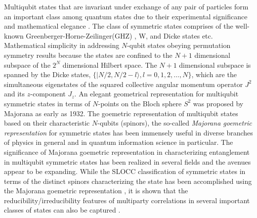 Multiqubit states that are invariant under exchange of any pair of particles form an important class among quantum states due to their experimental significance and mathematical elegance \cite{sym1,sym1a,sym1b,sym2,sym3}. The class of symmetric states comprises of the well-known Greenberger-Horne-Zeilinger(GHZ) \cite{ghz}, W, and Dicke states \cite{dicke} etc. Mathematical simplicity in addressing $N$-qubit  states obeying permutation symmetry results because the states are confined to the $N+1$ dimensional subspace of the $2^N$ dimensional Hilbert space. The $N+1$ dimensional subspace is spanned by the Dicke states, $\{\vert N/2, N/2-l\rangle,  l=0,1,2,\ldots,N\}$, which are the simultaneous eigenstates of the squared collective angular momentum operator $J^2$ and its $z$-component $J_z$. An elegant geometrical representation for  multiqubit symmetric states in terms of $N$-points on the Bloch sphere $S^2$ was proposed by Majorana \cite{majorana} as early as 1932. The goemetric representation of multiqubit states based on their characteristic $N$-qubits (spinors), the so-called {\em Majorana goemetric representation} for symmetric states \cite{majorana,1945,makela} has been  immensely useful in diverse branches of physics \cite{1945,jpa4,arxiv4,jpa5,ejtp6} in general and in quantum information science \cite{solano, mixed, usa, usa1,usa2,markham1,markham2,gebastin,markham3} in particular.  The significance of Majorana goemetric representation in characterizing entanglement in multiqubit symmetric states has been realized in several fields and the avenues appear to be expanding. While the SLOCC classification of symmetric states in terms of the distinct spinors characterizing the state has been accomplished using the Majorana goemetric representation \cite{solano, mixed}, it is shown that the reducibility/irreducibility features of multiparty correlations in several important classes of states can also be captured \cite{usa1,usa2,usa}. 

